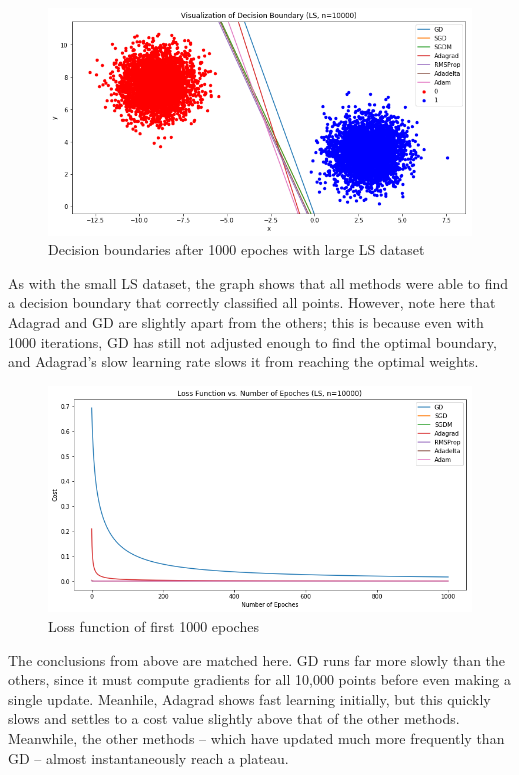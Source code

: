 \documentclass[twoside,11pt]{homework}
\begin{document}
\begin{figure}[H]
		\centering
		\includegraphics[scale=.5]{q5/sep_10000/lines_n10000.png}	
		\caption{Decision boundaries after 1000 epoches with large LS dataset}
	\end{figure}
As with the small LS dataset, the graph shows that all methods were able to find a decision boundary that correctly classified all points. However, note here that Adagrad and GD are slightly apart from the others; this is because even with 1000 iterations, GD has still not adjusted enough to find the optimal boundary, and Adagrad's slow learning rate slows it from reaching the optimal weights.

	\begin{figure}[H]
		\centering
		\includegraphics[scale=.5]{q5/sep_10000/loss_n10000.png}	
		\caption{Loss function of first 1000 epoches}
	\end{figure}

The conclusions from above are matched here. GD runs far more slowly than the others, since it must compute gradients for all 10,000 points before even making a single update. Meanhile, Adagrad shows fast learning initially, but this quickly slows and settles to a cost value slightly above that of the other methods. Meanwhile, the other methods -- which have updated much more frequently than GD -- almost instantaneously reach a plateau.
	
\end{document}
